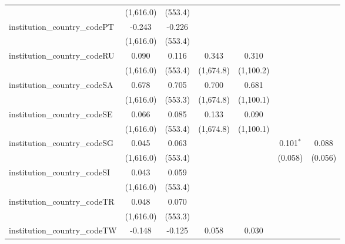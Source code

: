 \begin{tabular}{lcccccc}
                                         & (1,616.0)      & (553.4)        &               &               &              &   \\   
   institution\_country\_codePT          & -0.243         & -0.226         &               &               &              &   \\   
                                         & (1,616.0)      & (553.4)        &               &               &              &   \\   
   institution\_country\_codeRU          & 0.090          & 0.116          & 0.343         & 0.310         &              &   \\   
                                         & (1,616.0)      & (553.4)        & (1,674.8)     & (1,100.2)     &              &   \\   
   institution\_country\_codeSA          & 0.678          & 0.705          & 0.700         & 0.681         &              &   \\   
                                         & (1,616.0)      & (553.3)        & (1,674.8)     & (1,100.1)     &              &   \\   
   institution\_country\_codeSE          & 0.066          & 0.085          & 0.133         & 0.090         &              &   \\   
                                         & (1,616.0)      & (553.4)        & (1,674.8)     & (1,100.1)     &              &   \\   
   institution\_country\_codeSG          & 0.045          & 0.063          &               &               & 0.101$^{*}$  & 0.088\\   
                                         & (1,616.0)      & (553.4)        &               &               & (0.058)      & (0.056)\\   
   institution\_country\_codeSI          & 0.043          & 0.059          &               &               &              &   \\   
                                         & (1,616.0)      & (553.4)        &               &               &              &   \\   
   institution\_country\_codeTR          & 0.048          & 0.070          &               &               &              &   \\   
                                         & (1,616.0)      & (553.3)        &               &               &              &   \\   
   institution\_country\_codeTW          & -0.148         & -0.125         & 0.058         & 0.030         &              &   \\   

\end{tabular}
